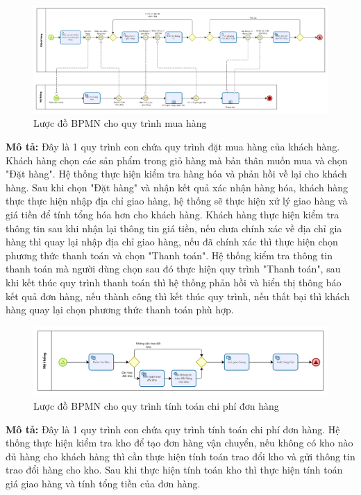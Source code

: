 \begin{figure}[!htp]
	\centering
	\includegraphics[width=15cm]{img/BPMN/customer_buy/customer_buy_order.png}
	\newline
	\caption{Lược đồ BPMN cho quy trình mua hàng}
\end{figure}
\textbf{Mô tả:} Đây là 1 quy trình con chứa quy trình đặt mua hàng của khách hàng. Khách hàng chọn các sản phẩm trong giỏ hàng mà bản thân muốn mua và chọn "Đặt hàng". Hệ thống thực hiện kiểm tra hàng hóa và phản hồi về lại cho khách hàng. Sau khi chọn "Đặt hàng" và nhận kết quả xác nhận hàng hóa, khách hàng thực thực hiện nhập địa chỉ giao hàng, hệ thống sẽ thực hiện xử lý giao hàng và giá tiền để tính tổng hóa hơn cho khách hàng. Khách hàng thực hiện kiểm tra thông tin sau khi nhận lại thông tin giá tiền, nếu chưa chính xác về địa chỉ gia hàng thì quay lại nhập địa chỉ giao hàng, nếu đã chính xác thì thực hiện chọn phương thức thanh toán và chọn "Thanh toán". Hệ thống kiểm tra thông tin thanh toán mà người dùng chọn sau đó thực hiện quy trình "Thanh toán", sau khi kết thúc quy trình thanh toán thì hệ thống phản hồi và hiển thị thông báo kết quả đơn hàng, nếu thành công thì kết thúc quy trình, nếu thất bại thì khách hàng quay lại chọn phương thức thanh toán phù hợp.

\begin{figure}[!htp]
	\centering
	\includegraphics[width=5in]{img/BPMN/customer_buy/customer_calc_fee.png}
	\newline
	\caption{Lược đồ BPMN cho quy trình tính toán chi phí đơn hàng}
\end{figure}
\textbf{Mô tả:} Đây là 1 quy trình con chứa quy trình tính toán chi phí đơn hàng. Hệ thống thực hiện kiểm tra kho để tạo đơn hàng vận chuyển, nếu không có kho nào đủ hàng cho khách hàng thì cần thực hiện tính toán trao đổi kho và gửi thông tin trao đổi hàng cho kho. Sau khi thực hiện tính toán kho thì thực hiện tính toán giá giao hàng và tính tổng tiền của đơn hàng.

